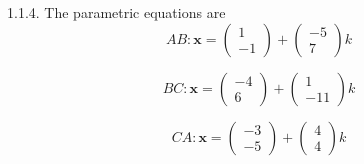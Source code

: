 \documentclass{book}
\begin{document}
1.1.4.	The parametric equations are\\
\begin{equation}
AB: \textbf{x}= 
\begin{pmatrix}
1\\
-1
\end{pmatrix}
+
\begin{pmatrix}
-5\\
7
\end{pmatrix}k
\end{equation}

\begin{equation}
BC: \textbf{x}= 
\begin{pmatrix}
-4\\
6
\end{pmatrix}
+
\begin{pmatrix}
1\\
-11
\end{pmatrix}k
\end{equation}

\begin{equation}
CA: \textbf{x}= 
\begin{pmatrix}
-3\\
-5
\end{pmatrix}
+
\begin{pmatrix}
4\\
4
\end{pmatrix}k
\end{equation}
\end{document}
